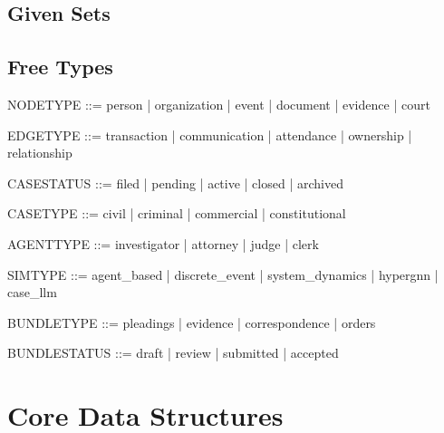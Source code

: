 \documentclass{article}
\begin{document}
\subsection{Given Sets}

\begin{zed}
\end{zed}

\begin{zed}
\end{zed}

\subsection{Free Types}

\begin{zed}
NODETYPE ::= person | organization | event | document | evidence | court
\end{zed}

\begin{zed}
EDGETYPE ::= transaction | communication | attendance | ownership | relationship
\end{zed}

\begin{zed}
CASESTATUS ::= filed | pending | active | closed | archived
\end{zed}

\begin{zed}
CASETYPE ::= civil | criminal | commercial | constitutional
\end{zed}

\begin{zed}
AGENTTYPE ::= investigator | attorney | judge | clerk
\end{zed}

\begin{zed}
SIMTYPE ::= agent\_based | discrete\_event | system\_dynamics | hypergnn | case\_llm
\end{zed}

\begin{zed}
BUNDLETYPE ::= pleadings | evidence | correspondence | orders
\end{zed}

\begin{zed}
BUNDLESTATUS ::= draft | review | submitted | accepted
\end{zed}

\newpage

\section{Core Data Structures}
\end{document}
